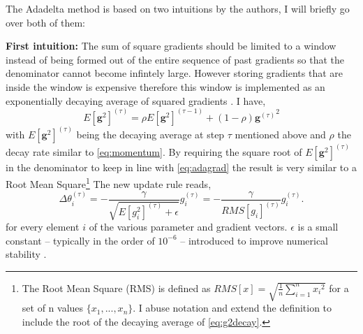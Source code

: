 The Adadelta method is based on two intuitions by the authors, I will briefly go over both of them:

\textbf{First intuition:} The sum of square gradients should be limited to a window instead of being formed out of the entire sequence of past gradients so that the denominator cannot become infintely large. However storing gradients that are inside the window is expensive therefore this window is implemented as an exponentially decaying average of squared gradients \citep{Zeiler2012ADADELTA:Method}. I have,
\begin{equation} \label{eq:g2decay}
    E[\bm{g}^2]^{(\tau)} = \rho E[\bm{g}^2]^{(\tau - 1)} + (1 - \rho) {\bm{g}^{(\tau)}}^2
\end{equation}
with $E[\bm{g}^2]^{(\tau)}$ being the decaying average at step $\tau$ mentioned above and $\rho$ the decay rate similar to \cref{eq:momentum}. By requiring the square root of $E[\bm{g}^2]^{(\tau)}$ in the denominator to keep in line with \cref{eq:adagrad} the result is very similar to a Root Mean Square\footnote{The Root Mean Square (RMS) is defined as $RMS[x] = \sqrt{\frac{1}{n}\sum_{i=1}^n{x_i}^2}$ for a set of n values $\{x_1,...,x_n\}$. I abuse notation and extend the definition to include the root of the decaying average of \cref{eq:g2decay}.} The new update rule reads,
\begin{equation} \label{eq:protoadadelta}
    \Delta \theta^{(\tau)}_i = - \dfrac{\gamma}{\sqrt{E[g_i^2]^{(\tau)} + \epsilon}} g^{(\tau)}_i = - \dfrac{\gamma}{RMS[g_i]^{(\tau)}} g^{(\tau)}_i.
\end{equation}
for every element $i$ of the various parameter and gradient vectors. $\epsilon$ is a small constant -- typically in the order of $10^{-6}$ -- introduced to improve numerical stability \citep{Becker1989ImprovingMethods}. \\

